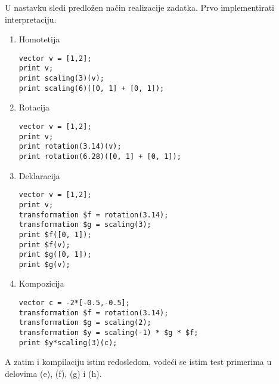 \documentclass[a4paper]{article}
\begin{document}
\begin{enumerate}
U nastavku sledi predlo\v zen na\v cin realizacije zadatka. Prvo
implementirati interpretaciju.
\begin{enumerate}
\item Homotetija
\begin{verbatim}
vector v = [1,2]; 
print v;
print scaling(3)(v);
print scaling(6)([0, 1] + [0, 1]);
\end{verbatim}
\item Rotacija
\begin{verbatim}
vector v = [1,2]; 
print v;
print rotation(3.14)(v);
print rotation(6.28)([0, 1] + [0, 1]);
\end{verbatim}
\item Deklaracija
\begin{verbatim}
vector v = [1,2]; 
print v;
transformation $f = rotation(3.14);
transformation $g = scaling(3);
print $f([0, 1]);
print $f(v);
print $g([0, 1]);
print $g(v);
\end{verbatim}
\item Kompozicija
\begin{verbatim}
vector c = -2*[-0.5,-0.5];
transformation $f = rotation(3.14);
transformation $g = scaling(2);
transformation $y = scaling(-1) * $g * $f;
print $y*scaling(3)(c);
\end{verbatim}
\end{enumerate}

A zatim i kompilaciju istim redosledom, vode\' ci se istim test
primerima u delovima (e), (f), (g) i (h).

\end{enumerate}
\end{document}
